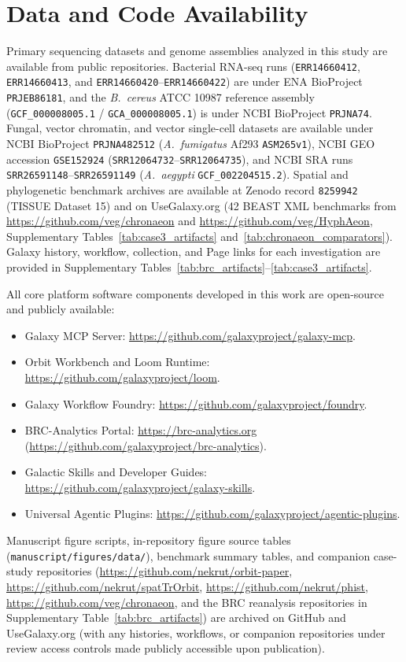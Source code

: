 \documentclass[11pt,letterpaper]{article}
\begin{document}
\section*{Data and Code Availability}
Primary sequencing datasets and genome assemblies analyzed in this study are available from public repositories. Bacterial RNA-seq runs (\texttt{ERR14660412}, \texttt{ERR14660413}, and \texttt{ERR14660420}--\texttt{ERR14660422}) are under ENA BioProject \texttt{PRJEB86181}, and the \textit{B.\ cereus} ATCC 10987 reference assembly (\texttt{GCF\_000008005.1} / \texttt{GCA\_000008005.1}) is under NCBI BioProject \texttt{PRJNA74}. Fungal, vector chromatin, and vector single-cell datasets are available under NCBI BioProject \texttt{PRJNA482512} (\textit{A.\ fumigatus} Af293 \texttt{ASM265v1}), NCBI GEO accession \texttt{GSE152924} (\texttt{SRR12064732}--\texttt{SRR12064735}), and NCBI SRA runs \texttt{SRR26591148}--\texttt{SRR26591149} (\textit{A.\ aegypti} \texttt{GCF\_002204515.2}). Spatial and phylogenetic benchmark archives are available at Zenodo record \texttt{8259942} (TISSUE Dataset 15) and on UseGalaxy.org (42 BEAST XML benchmarks from \url{https://github.com/veg/chronaeon} and \url{https://github.com/veg/HyphAeon}, Supplementary Tables~\ref{tab:case3_artifacts} and~\ref{tab:chronaeon_comparators}). Galaxy history, workflow, collection, and Page links for each investigation are provided in Supplementary Tables~\ref{tab:brc_artifacts}--\ref{tab:case3_artifacts}.

All core platform software components developed in this work are open-source and publicly available:
\begin{itemize}
    \item Galaxy MCP Server: \url{https://github.com/galaxyproject/galaxy-mcp}.
    \item Orbit Workbench and Loom Runtime: \url{https://github.com/galaxyproject/loom}.
    \item Galaxy Workflow Foundry: \url{https://github.com/galaxyproject/foundry}.
    \item BRC-Analytics Portal: \url{https://brc-analytics.org} (\url{https://github.com/galaxyproject/brc-analytics}).
    \item Galactic Skills and Developer Guides: \url{https://github.com/galaxyproject/galaxy-skills}.
    \item Universal Agentic Plugins: \url{https://github.com/galaxyproject/agentic-plugins}.
\end{itemize}
Manuscript figure scripts, in-repository figure source tables (\texttt{manuscript/figures/data/}), benchmark summary tables, and companion case-study repositories (\url{https://github.com/nekrut/orbit-paper}, \url{https://github.com/nekrut/spatTrOrbit}, \url{https://github.com/nekrut/phist}, \url{https://github.com/veg/chronaeon}, and the BRC reanalysis repositories in Supplementary Table~\ref{tab:brc_artifacts}) are archived on GitHub and UseGalaxy.org (with any histories, workflows, or companion repositories under review access controls made publicly accessible upon publication).
\end{document}
